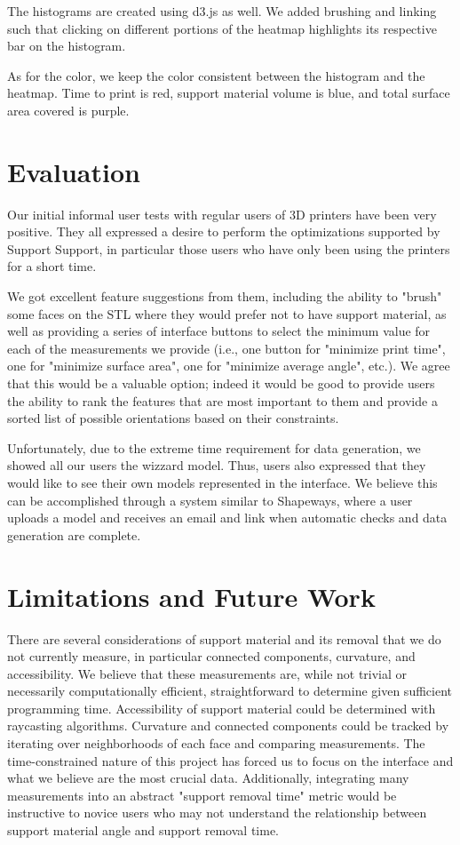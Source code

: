 \documentclass{sigchi}
\begin{document}
The histograms are created using d3.js as well. We added brushing and linking such that clicking on different portions of the heatmap highlights its respective bar on the histogram.

As for the color, we keep the color consistent between the histogram and the heatmap. Time to print is red, support material volume is blue, and total surface area covered is purple.

\section{Evaluation}
Our initial informal user tests with regular users of 3D printers have been very positive.  They all expressed a desire to perform the optimizations supported by Support Support, in particular those users who have only been using the printers for a short time.

We got excellent feature suggestions from them, including the ability to "brush" some faces on the STL where they would prefer not to have support material, as well as providing a series of interface buttons to select the minimum value for each of the measurements we provide (i.e., one button for "minimize print time", one for "minimize surface area", one for "minimize average angle", etc.).  We agree that this would be a valuable option; indeed it would be good to provide users the ability to rank the features that are most important to them and provide a sorted list of possible orientations based on their constraints.

Unfortunately, due to the extreme time requirement for data generation, we showed all our users the wizzard model.  Thus, users also expressed that they would like to see their own models represented in the interface.  We believe this can be accomplished through a system similar to Shapeways, where a user uploads a model and receives an email and link when automatic checks and data generation are complete.

\section{Limitations and Future Work}
There are several considerations of support material and its removal that we do not currently measure, in particular connected components, curvature, and accessibility.  We believe that these measurements are, while not trivial or necessarily computationally efficient, straightforward to determine given sufficient programming time.  Accessibility of support material could be determined with raycasting algorithms.  Curvature and connected components could be tracked by iterating over neighborhoods of each face and comparing measurements.  The time-constrained nature of this project has forced us to focus on the interface and what we believe are the most crucial data.  Additionally, integrating many measurements into an abstract "support removal time" metric would be instructive to novice users who may not understand the relationship between support material angle and support removal time.
\end{document}
